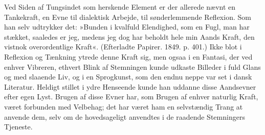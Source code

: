\documentclass[12pt,a4paper,openany]{book}
\newcommand{\opage}[1]{\marginnote{\footnotesize\textit{[#1]}}}
\begin{document}
Ved Siden af Tungsindet som herskende Element er
der allerede nævnt en Tankekraft, en Evne til dialektisk
Arbejde, til sønderlemmende Reflexion. Som han selv
udtrykker det: »Bunden i kvalfuld Elendighed, som en
Fugl, man har stækket, saaledes er jeg, medens jeg dog
har beholdt hele min Aands Kraft, den vistnok overordentlige
Kraft«. (Efterladte Papirer. 1849. p. 401.)
Ikke blot i Reflexion og Tænkning ytrede denne Kraft
\opage{33}sig, men ogsaa i en Fantasi, der ved enhver Vibreren,
ethvert Blink af Stemningen kunde udkaste Billeder i
fuld Glans og med slaaende Liv, og i en Sprogkunst,
som den endnu neppe var set i dansk Literatur. Heldigt
stillet i ydre Henseende kunde han uddanne disse Aandsevner
efter egen Lyst. Brugen af disse Evner har, som
Brugen af enhver naturlig Kraft, været forbunden med
Velbehag; det har været ham en selvstændig Trang at
anvende dem, selv om de hovedsageligt anvendtes i de
raadende Stemningers Tjeneste.
\end{document}
